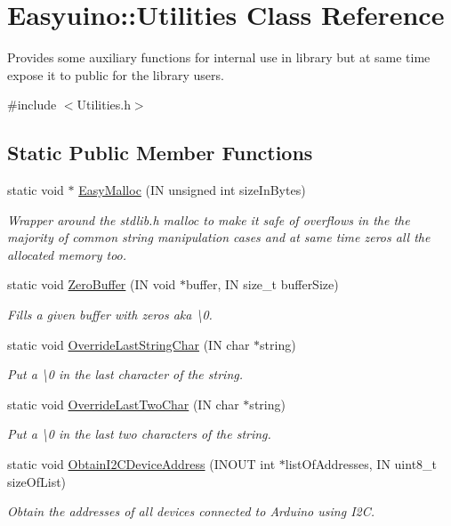 \hypertarget{class_easyuino_1_1_utilities}{}\section{Easyuino\+:\+:Utilities Class Reference}
\label{class_easyuino_1_1_utilities}


Provides some auxiliary functions for internal use in library but at same time expose it to public for the library users.  




{\ttfamily \#include $<$Utilities.\+h$>$}

\subsection*{Static Public Member Functions}
\begin{DoxyCompactItemize}
\item 
static void $\ast$ \hyperlink{class_easyuino_1_1_utilities_a5a7991900cbc3f9e4cda1289ee7a7ee1}{Easy\+Malloc} (IN unsigned int size\+In\+Bytes)
\begin{DoxyCompactList}\small\item\em Wrapper around the stdlib.\+h malloc to make it safe of overflows in the the majority of common string manipulation cases and at same time zero\textquotesingle{}s all the allocated memory too. \end{DoxyCompactList}\item 
static void \hyperlink{class_easyuino_1_1_utilities_a736bd038601132c4beac24cd88340695}{Zero\+Buffer} (IN void $\ast$buffer, IN size\+\_\+t buffer\+Size)
\begin{DoxyCompactList}\small\item\em Fills a given buffer with zeros aka \textbackslash{}0. \end{DoxyCompactList}\item 
static void \hyperlink{class_easyuino_1_1_utilities_a4d7f4573ee544e72da2945f18d043704}{Override\+Last\+String\+Char} (IN char $\ast$string)
\begin{DoxyCompactList}\small\item\em Put a \textbackslash{}0 in the last character of the string. \end{DoxyCompactList}\item 
static void \hyperlink{class_easyuino_1_1_utilities_a8f5da1e6939a43f10702b16c2fdeb8e0}{Override\+Last\+Two\+Char} (IN char $\ast$string)
\begin{DoxyCompactList}\small\item\em Put a \textbackslash{}0 in the last two characters of the string. \end{DoxyCompactList}\item 
static void \hyperlink{class_easyuino_1_1_utilities_a1e9c0e9ed293db6e7c3d6da6b6a40f62}{Obtain\+I2\+C\+Device\+Address} (I\+N\+O\+UT int $\ast$list\+Of\+Addresses, IN uint8\+\_\+t size\+Of\+List)
\begin{DoxyCompactList}\small\item\em Obtain the addresses of all devices connected to Arduino using I2C. \end{DoxyCompactList}\end{DoxyCompactItemize}


